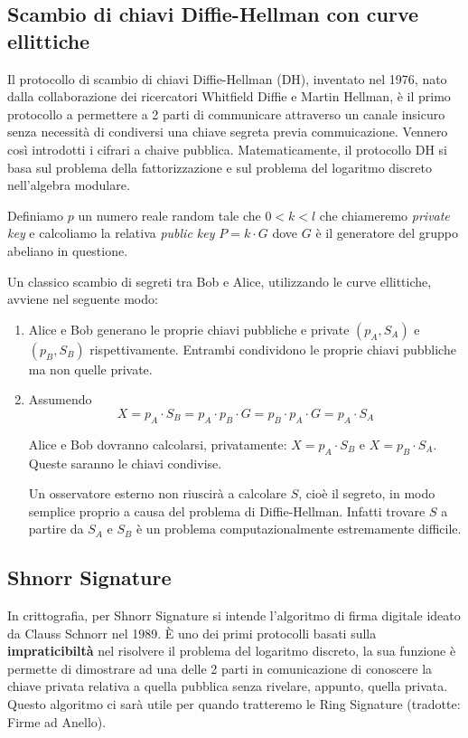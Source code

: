 \documentclass[12pt,a4paper]{article}
\begin{document}
\subsection{Scambio di chiavi Diffie-Hellman con curve ellittiche}
Il protocollo di scambio di chiavi Diffie-Hellman (DH), inventato nel 1976, nato
dalla collaborazione dei ricercatori Whitfield Diffie e Martin Hellman, è il
primo protocollo a permettere a 2 parti di communicare attraverso un canale
insicuro senza necessità di condiversi una chiave segreta previa commuicazione.
Vennero così introdotti i cifrari a chaive pubblica. Matematicamente, il
protocollo DH si basa sul problema della fattorizzazione e sul problema del
logaritmo discreto nell'algebra modulare.

Definiamo $ p $ un numero reale random tale che $0 < k < l$ che chiameremo
\textit{private key} e calcoliamo la relativa \textit{public key} $ P = k \cdot
G $ dove $ G $ è il generatore del gruppo abeliano in questione.

Un classico scambio di segreti tra Bob e Alice, utilizzando le curve ellittiche,
avviene nel seguente modo:

\begin{enumerate}
    \item Alice e Bob generano le proprie chiavi pubbliche e private $ (p_A,
    S_A) $ e $ (p_B, S_B) $ rispettivamente. Entrambi condividono le proprie
    chiavi pubbliche ma non quelle private.
    \item Assumendo
        $$ X = p_A \cdot S_B = p_A \cdot p_B \cdot G = p_B \cdot p_A \cdot G =
        p_A \cdot S_A $$

        Alice e Bob dovranno calcolarsi, privatamente: $ X = p_A \cdot S_B $ e $
        X = p_B \cdot S_A $. Queste saranno le chiavi condivise.

        Un osservatore esterno non riuscirà a calcolare $ S $, cioè il segreto,
        in modo semplice proprio a causa del problema di Diffie-Hellman. Infatti
        trovare $ S $ a partire da $ S_A $ e $ S_B $ è un problema
        computazionalmente estremamente difficile.
\end{enumerate}

\subsection{Shnorr Signature}
In crittografia, per Shnorr Signature si intende l'algoritmo di firma digitale
ideato da Clauss Schnorr nel 1989. È uno dei primi protocolli basati sulla
\textbf{impraticibiltà} nel risolvere il problema del logaritmo discreto, la sua
funzione è permette di dimostrare ad una delle 2 parti in comunicazione di
conoscere la chiave privata relativa a quella pubblica senza rivelare, appunto,
quella privata. Questo algoritmo ci sarà utile per quando tratteremo le Ring
Signature (tradotte: Firme ad Anello).
\end{document}
